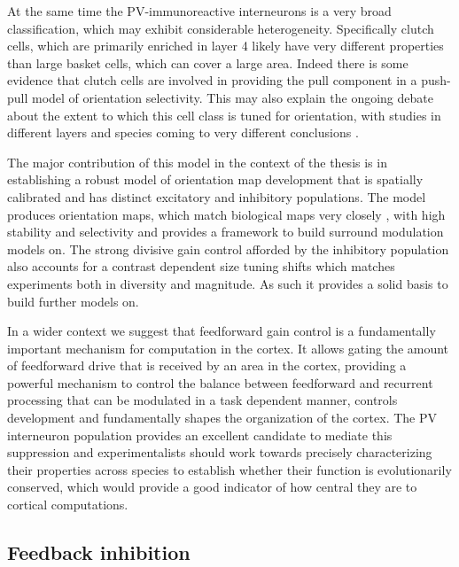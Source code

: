 At the same time the PV-immunoreactive interneurons is a very broad
classification, which may exhibit considerable
heterogeneity. Specifically clutch cells, which are primarily enriched
in layer 4 likely have very different properties than large basket
cells, which can cover a large area. Indeed there is some evidence
that clutch cells are involved in providing the pull component in a
push-pull model of orientation selectivity. This may also explain the
ongoing debate about the extent to which this cell class is tuned for
orientation, with studies in different layers and species coming to
very different conclusions \citep{Cardin2007, Ma2011, Hofer2011}.

The major contribution of this model in the context of the thesis is
in establishing a robust model of orientation map development that is
spatially calibrated and has distinct excitatory and inhibitory
populations. The model produces orientation maps, which match
biological maps very closely \citep{Kaschube2010, Stevens2013b}, with
high stability and selectivity and provides a framework to build
surround modulation models on. The strong divisive gain control
afforded by the inhibitory population also accounts for a contrast
dependent size tuning shifts which matches experiments both in
diversity and magnitude. As such it provides a solid basis to build
further models on.

In a wider context we suggest that feedforward gain control is a
fundamentally important mechanism for computation in the cortex. It
allows gating the amount of feedforward drive that is received by an
area in the cortex, providing a powerful mechanism to control the
balance between feedforward and recurrent processing that can be
modulated in a task dependent manner, controls development and
fundamentally shapes the organization of the cortex. The PV
interneuron population provides an excellent candidate to mediate this
suppression and experimentalists should work towards precisely
characterizing their properties across species to establish whether
their function is evolutionarily conserved, which would provide a good
indicator of how central they are to cortical computations.

\subsection{Feedback inhibition}

